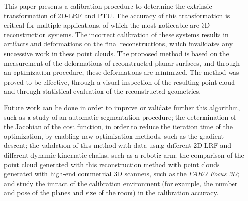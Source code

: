 \documentclass[conference]{IEEEtran}
\begin{document}
This paper presents a calibration procedure to determine the extrinsic transformation of 2D-LRF and PTU. The accuracy of this transformation is critical for multiple applications, of which the most noticeable are 3D reconstruction systems. The incorrect calibration of these systems results in artifacts and deformations on the final reconstructions, which invalidates any successive work in these point clouds. The proposed method is based on the measurement of the deformations of reconstructed planar surfaces, and through an optimization procedure, these deformations are minimized. The method was proved to be effective, through a visual inspection of the resulting point cloud and through statistical evaluation of the reconstructed geometries.

Future work can be done in order to improve or validate further this algorithm, such as a study of an automatic segmentation procedure; the determination of the Jacobian of the cost function, in order to reduce the iteration time of the optimization, by enabling new optimization methods, such as the gradient descent; the validation of this method with data using different 2D-LRF and different dynamic kinematic chains, such as a robotic arm; the comparison of the point cloud generated with this reconstruction method with point clouds generated with high-end commercial 3D scanners, such as the \textit{FARO Focus 3D}; and study the impact of the calibration environment (for example, the number and pose of the planes and size of the room) in the calibration accuracy.




\end{document}
